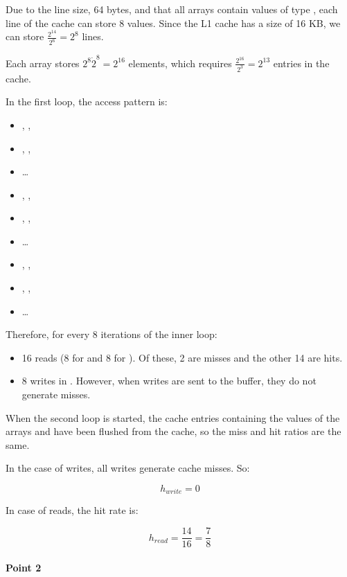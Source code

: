 Due to the line size, 64 bytes, and that all arrays contain values of type 
, each line of the cache can store 8 values. Since the L1 
cache has a size of 16 KB, we can store $\frac{2^{14}}{2^6} = 2^8$ lines.

Each array stores $2^8 \dot 2^8 = 2^{16}$ elements, which requires 
$\frac{2^{16}}{2^3} = 2^{13}$ entries in the cache.

In the first loop, the access pattern is:

\begin{itemize}
  \item {}, , 
  \item {}, , 
  \item \ldots
  \item {}, , 
  \item {}, , 
  \item \ldots
  \item {}, , 
  \item {}, , 
  \item \ldots
\end{itemize}

Therefore, for every 8 iterations of the inner loop:

\begin{itemize}
  \item 16 reads (8 for  and 8 for ). Of these, 2 are misses and the other 14 are hits.
  \item 8 writes in . However, when writes are sent to the buffer, they do not generate misses.
\end{itemize}

When the second loop is started, the cache entries containing the values of the arrays  
and  have been flushed from the cache, so the miss and hit ratios are the same.

In the case of writes, all writes generate cache misses. So:


\[
h_{write} = 0
\]

In case of reads, the hit rate is:

\[
h_{read}  = \frac{14}{16} = \frac{7}{8}
\]

\paragraph{Point 2}

